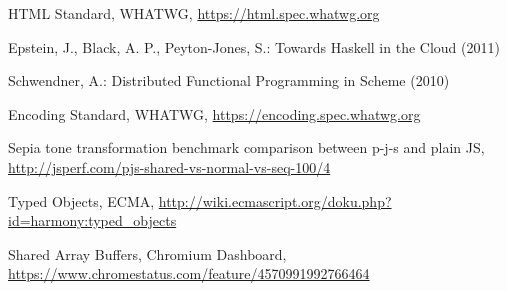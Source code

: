 \documentclass[runningheads,a4paper]{llncs}
\begin{document}
\begin{thebibliography}{4}
 HTML Standard, WHATWG, \url{https://html.spec.whatwg.org}

 Epstein, J., Black, A. P., Peyton-Jones, S.: Towards Haskell in the Cloud (2011)

 Schwendner, A.: Distributed Functional Programming in Scheme (2010)

 Encoding Standard, WHATWG, \url{https://encoding.spec.whatwg.org}

 Sepia tone transformation benchmark comparison between p-j-s and plain JS, \url{http://jsperf.com/pjs-shared-vs-normal-vs-seq-100/4}

 Typed Objects, ECMA, \url{http://wiki.ecmascript.org/doku.php?id=harmony:typed_objects}

 Shared Array Buffers, Chromium Dashboard, \url{https://www.chromestatus.com/feature/4570991992766464}

\end{thebibliography}
\end{document}
